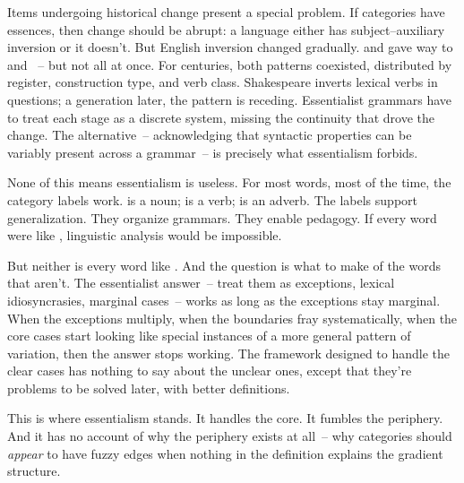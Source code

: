 Items undergoing historical change present a special problem. If categories have essences, then change should be abrupt: a language either has subject–auxiliary inversion or it doesn't. But English inversion changed gradually.  and  gave way to  and ~-- but not all at once. For centuries, both patterns coexisted, distributed by register, construction type, and verb class. Shakespeare inverts lexical verbs in questions; a generation later, the pattern is receding. Essentialist grammars have to treat each stage as a discrete system, missing the continuity that drove the change. The alternative~-- acknowledging that syntactic properties can be variably present across a grammar~-- is precisely what essentialism forbids.

None of this means essentialism is useless. For most words, most of the time, the category labels work.  is a noun;  is a verb;  is an adverb. The labels support generalization. They organize grammars. They enable pedagogy. If every word were like , linguistic analysis would be impossible.

But neither is every word like . And the question is what to make of the words that aren't. The essentialist answer~-- treat them as exceptions, lexical idiosyncrasies, marginal cases~-- works as long as the exceptions stay marginal. When the exceptions multiply, when the boundaries fray systematically, when the core cases start looking like special instances of a more general pattern of variation, then the answer stops working. The framework designed to handle the clear cases has nothing to say about the unclear ones, except that they're problems to be solved later, with better definitions.

This is where essentialism stands. It handles the core. It fumbles the periphery. And it has no account of why the periphery exists at all~-- why categories should \emph{appear} to have fuzzy edges when nothing in the definition explains the gradient structure.

